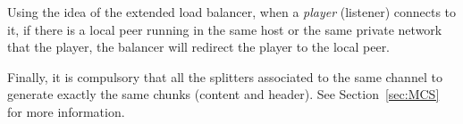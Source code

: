 Using the idea of the extended load balancer, when a \emph{player}
(listener) connects to it, if there is a local peer running in the
same host or the same private network that the player, the balancer
will redirect the player to the local peer.

Finally, it is compulsory that all the splitters associated to the
same channel to generate exactly the same chunks (content and
header). See Section~\ref{sec:MCS} for more information.

\begin{comment}
the player
communicates\footnote{This is a reliable communication. Reliable
  messages are transmitted over TCP. On the other hand, unreliable
  messages, which can be lost in transit, are transmitted over UDP. In
  any case, the reception of a packet is a permanent blocking action,
  at least a timeout is indicated.} with the load balancer to tell it
that there is a peer running in the same host that the player. Thus,
when the player requests to the load balancer the reception of the
stream, the load balancer redirects it towards the local
peer.\footnote{If there is a peer running in the same host that the
  player, the load balancer will redirect the player to the local
  peer, and the channel served to the player will be the one passed as
  a parameter when the peer was instantiated. In other words, the
  channel specified by the player in its request to the load balancer
  and the peer will be ignored.}

When a network entity (usually, a player) connects with a peer, this
must connects with a splitter which is transmitting the stream
selected by the user. Depending on maximum number of potential peers
that are retrieving the same channel, more than one splitter could be
available. This information is served by a \emph{splitters tracker},
and generated when a new splitter is instantiated. The tracker keeps
updated a table indexed by names of channels, where every entry
contains a list of splitters that are transmitting the corresponding
channel. Therefore, to find a suitable splitter, the peer first
retrieves from the splitters tracker a list of splitters. Then, the
peer tries to connect with all the splitters\footnote{Those splitters
  with full teams should not accept new connections from peers.} in
parallel, and the fastest connection determines the selected splitter
(the rest of successful connections are closed). This procedure should
select the ``closest'' splitter to the peer in terms of network
latency.


\end{comment}

